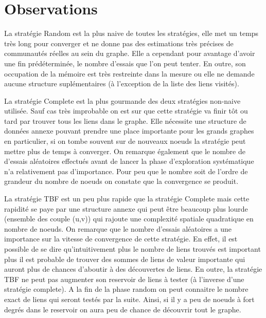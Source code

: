 \section{Observations}

La stratégie Random est la plus naive de toutes les stratégies,
elle met un temps très long pour converger et ne donne pas des estimations
très précises de communautés réelles au sein du graphe. Elle a cependant
pour avantage d'avoir une fin prédéterminée, le nombre d'essais que l'on peut tenter.
En outre, son occupation de la mémoire est très restreinte dans la mesure ou elle ne demande
aucune structure suplémentaires (à l'exception de la liste des liens visités).

La stratégie Complete est la plus gourmande des deux stratégies non-naive utilisée.
Sauf cas très improbable on est sur que cette stratégie va finir tôt ou tard par trouver
tous les liens dans le graphe. Elle nécessite une structure de données annexe pouvant prendre
une place importante pour les grands graphes en particulier, si on tombe souvent sur de nouveaux noeuds
la stratégie peut mettre plus de temps à converger.
On remarque également que le nombre de d'essais aléatoires effectués avant de lancer la phase
d'exploration systématique n'a relativement pas d'importance. Pour peu que le nombre soit
de l'ordre de grandeur du nombre de noeuds on constate que la convergence se produit.

La stratégie TBF est un peu plus rapide que la stratégie Complete mais cette rapidité se paye par
une structure annexe qui peut être beaucoup plus lourde (ensemble des couple (u,v)) qui rajoute une
complexité spatiale quadratique en nombre de noeuds.
On remarque que le nombre d'essais aléatoires a une importance sur la vitesse de convergence de
cette stratégie. En effet, il est possible de se dire qu'intuitivement
plus le nombre de liens trouvés est important plus il est probable de trouver des sommes de liens
de valeur importante qui auront plus de chances d'aboutir à des découvertes de liens.
En outre, la stratégie TBF ne peut pas augmenter son reservoir de liens
à tester (à l'inverse d'une stratégie complete).
 A la fin de la phase random on peut connaitre le nombre exact de liens qui seront testés
par la suite. Ainsi, si il y a peu de noeuds à fort degrés dans le reservoir on aura peu de chance de
découvrir tout le graphe.
